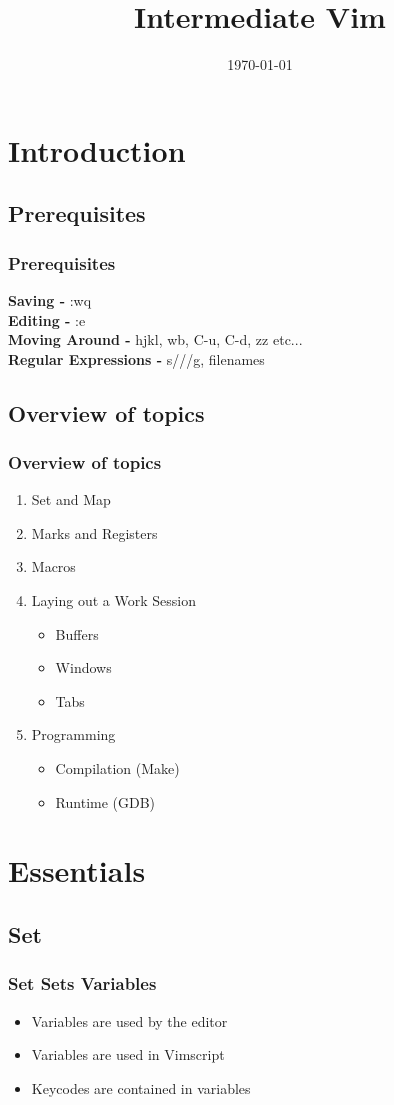 \documentclass{beamer}
\title{Intermediate Vim}
\date{\today}
\begin{document}
\frame{\titlepage}

\section{Introduction}
\subsection{Prerequisites}
\frame 
{
    \frametitle{Prerequisites}
    \textbf{Saving -} :wq\\
    \textbf{Editing -} :e\\
    \textbf{Moving Around -} hjkl, wb, C-u, C-d, zz etc... \\
    \textbf{Regular Expressions -} s///g, filenames
}

\subsection{Overview of topics}
\frame
{
    \frametitle{Overview of topics}

    \begin{enumerate}
        \item Set and Map
        \item Marks and Registers
        \item Macros
        \item Laying out a Work Session
        \begin{itemize}
            \item Buffers
            \item Windows
            \item Tabs
        \end{itemize}
        \item Programming
        \begin{itemize}
            \item Compilation (Make)
            \item Runtime (GDB)
        \end{itemize}

    \end{enumerate}
}

\section{Essentials}
\subsection{Set}
\frame
{
    \frametitle{Set Sets Variables}

    \begin{itemize}
        \item Variables are used by the editor
        \item Variables are used in Vimscript
        \item Keycodes are contained in variables
    \end{itemize}
}
\end{document}
